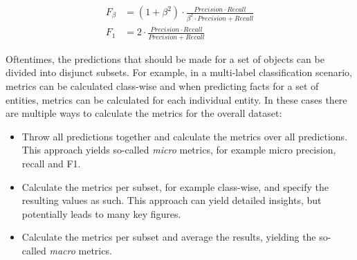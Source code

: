 \begin{align}
    F_\beta &= (1 + \beta^2) \cdot \frac{Precision \cdot Recall}{\beta^2 \cdot Precision + Recall}
    \label{eq:2_basics/2_metrics/2_prf/f_beta} \\
    F_1 &= 2 \cdot \frac{Precision \cdot Recall}{Precision + Recall}
    \label{eq:2_basics/2_metrics/2_prf/f_1}
\end{align}

Oftentimes, the predictions that should be made for a set of objects can be divided into disjunct subsets. For example, in a multi-label classification scenario, metrics can be calculated class-wise and when predicting facts for a set of entities, metrics can be calculated for each individual entity. In these cases there are multiple ways to calculate the metrics for the overall dataset:

\begin{itemize}
    \item Throw all predictions together and calculate the metrics over all predictions. This approach yields so-called \emph{micro} metrics, for example micro precision, recall and F1.

    \item Calculate the metrics per subset, for example class-wise, and specify the resulting values as such. This approach can yield detailed insights, but potentially leads to many key figures.

    \item Calculate the metrics per subset and average the results, yielding the so-called \emph{macro} metrics.
\end{itemize}
